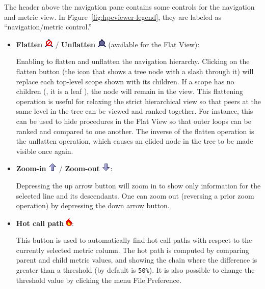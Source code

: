  The header above the navigation pane contains some controls for the navigation and metric view.
In Figure~\ref{fig:hpcviewer-legend}, they are labeled as ``navigation/metric control.''
\begin{itemize}

\item \textbf{Flatten} \includegraphics[scale=.8]{fig/Flatten.png} / 
       \textbf{Unflatten} \includegraphics[scale=.8]{fig/Unflatten.png}
      (available for the Flat View):

Enabling to flatten and unflatten the navigation hierarchy.
Clicking on the flatten button (the icon that shows a tree node with a slash through it) will replace each top-level scope shown with its children.
If a scope has no children (\ie{}, it is a leaf ), the node will remain in the view.
This flattening operation is useful for relaxing the strict hierarchical view so that peers at the same level in the tree can be viewed and ranked together.
For instance, this can be used to hide procedures in the Flat View so that outer loops can be ranked and compared to one another.
The inverse of the flatten operation is the unflatten operation, which causes an elided node in the tree to be made visible once again.

\item \textbf{Zoom-in} \includegraphics[scale=.8]{fig/ZoomIn.png} /
      \textbf{Zoom-out} \includegraphics[scale=.8]{fig/ZoomOut.png}:

Depressing the up arrow button will zoom in to show only information for the selected line and its descendants.
One can zoom out (reversing a prior zoom operation) by depressing the down arrow button.

\item \textbf{Hot call path} \includegraphics[scale=.8]{fig/flameIcon.png}:

This button is used to automatically find hot call paths with respect to the currently selected metric column.
The hot path is computed by comparing parent and child metric values, and showing the chain where the difference is greater than a threshold (by default is \texttt{50\%}).
It is also possible to change the threshold value by clicking the menu File|Preference.


\end{itemize}
